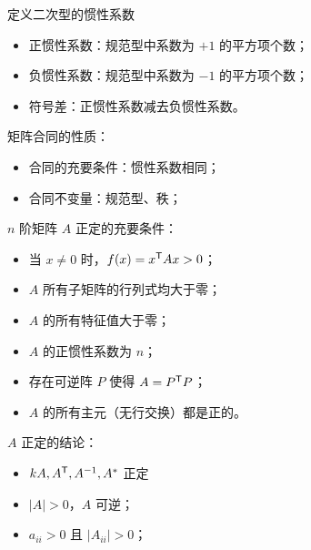 定义二次型的惯性系数
\begin{itemize}
	\item 正惯性系数：规范型中系数为 $+1$ 的平方项个数；
	\item 负惯性系数：规范型中系数为 $-1$ 的平方项个数；
	\item 符号差：正惯性系数减去负惯性系数。
\end{itemize}

矩阵合同的性质：
\begin{itemize}
	\item 合同的充要条件：惯性系数相同；
	\item 合同不变量：规范型、秩；
\end{itemize}

$n$ 阶矩阵 $A$ 正定的充要条件：
\begin{itemize}
	\item 当 $x \neq 0$ 时，$f(x) = {x}^\mathsf{T}Ax > 0$；
	\item $A$ 所有子矩阵的行列式均大于零；
	\item $A$ 的所有特征值大于零；
	\item $A$ 的正惯性系数为 $n$；
	\item 存在可逆阵 $P$ 使得 $A = {P}^\mathsf{T}P$；
	\item $A$ 的所有主元（无行交换）都是正的。
\end{itemize}

$A$ 正定的结论：
\begin{itemize}
	\item $kA, {A}^\mathsf{T}, A^{-1}, A^*$ 正定
	\item $|A|>0$，$A$ 可逆；
	\item $a_{ii} > 0$ 且 $|A_{ii}| > 0$；
\end{itemize}
